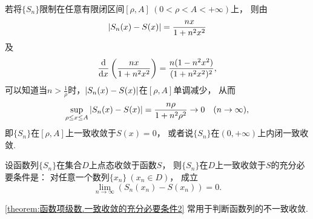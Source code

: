 \begin{example}
若将\(\{S_n\}\)限制在任意有限闭区间\([\rho,A]\ (0<\rho<A<+\infty)\)上，
则由\[
	\abs{S_n(x) - S(x)} = \frac{nx}{1+n^2x^2}
\]及\[
	\dv{x} \left(\frac{nx}{1+n^2x^2}\right)
	= \frac{n(1-n^2x^2)}{(1+n^2x^2)^2},
\]
可以知道当\(n>\frac1\rho\)时，\(\abs{S_n(x) - S(x)}\)在\([\rho,A]\)单调减少，
从而\[
	\sup_{\rho \leq x \leq A} \abs{S_n(x) - S(x)}
	= \frac{n\rho}{1+n^2\rho^2}
	\to 0
	\quad(n\to\infty),
\]
即\(\{S_n\}\)在\([\rho,A]\)上一致收敛于\(S(x)=0\)，
或者说\(\{S_n\}\)在\((0,+\infty)\)上内闭一致收敛.
\end{example}

\begin{theorem}\label{theorem:函数项级数.一致收敛的充分必要条件2}
设函数列\(\{S_n\}\)在集合\(D\)上点态收敛于函数\(S\)，
则\(\{S_n\}\)在\(D\)上一致收敛于\(S\)的充分必要条件是：
对任意一个数列\(\{x_n\}\ (x_n \in D)\)，
成立\[
	\lim_{n\to\infty} (S_n(x_n) - S(x_n)) = 0.
\]
\end{theorem}
\cref{theorem:函数项级数.一致收敛的充分必要条件2}
常用于判断函数列的不一致收敛.
